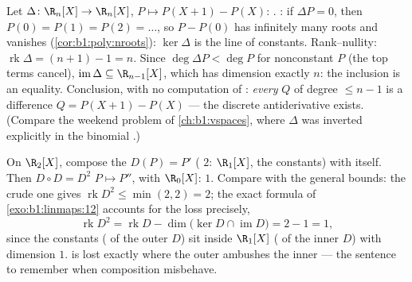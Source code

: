 \begin{example}
\label{ex:b1:linmaps:delta}
Let $\Delta \colon \R_n[X] \to \R_n[X]$, $P \mapsto P(X+1) -
P(X)$: . : if $\Delta P = 0$, then $P(0) = P(1) =
P(2) = \dots$, so $P - P(0)$ has infinitely many roots and
vanishes (\cref{cor:b1:poly:nroots}): $\ker\Delta$ is the line of
constants. Rank--nullity: $\operatorname{rk}\Delta = (n + 1) - 1
= n$. Since $\deg \Delta P < \deg P$ for nonconstant $P$ (the top
terms cancel), $\operatorname{im}\Delta \subseteq \R_{n-1}[X]$,
which has dimension exactly $n$: the inclusion is an equality.
Conclusion, with no computation of : \emph{every}
 $Q$ of degree $\leq n - 1$ is a difference $Q = P(X+1)
- P(X)$ --- the discrete antiderivative exists. (Compare the
weekend problem of \cref{ch:b1:vspaces}, where $\Delta$ was
inverted explicitly in the binomial .)
\end{example}

\begin{example}
\label{ex:b1:linmaps:rankbookkeeping}
On $\R_2[X]$, compose the  $D(P) = P'$ ( $2$:
 $\R_1[X]$,  the constants) with itself. Then $D
\circ D = D^2$  $P \mapsto P''$, with  $\R_0[X]$: 
$1$. Compare with the general bounds: the crude one gives
$\operatorname{rk} D^2 \leq \min(2, 2) = 2$; the exact formula
of \cref{exo:b1:linmaps:12} accounts for the loss precisely,
\[
\operatorname{rk} D^2 = \operatorname{rk} D -
\dim\bigl(\ker D \cap \operatorname{im} D\bigr) = 2 - 1 = 1 ,
\]
since the constants ( of the outer $D$) sit inside
$\R_1[X]$ ( of the inner $D$) with dimension $1$.  is
lost exactly where the outer  ambushes the inner 
--- the sentence to remember when composition  misbehave.
\end{example}

